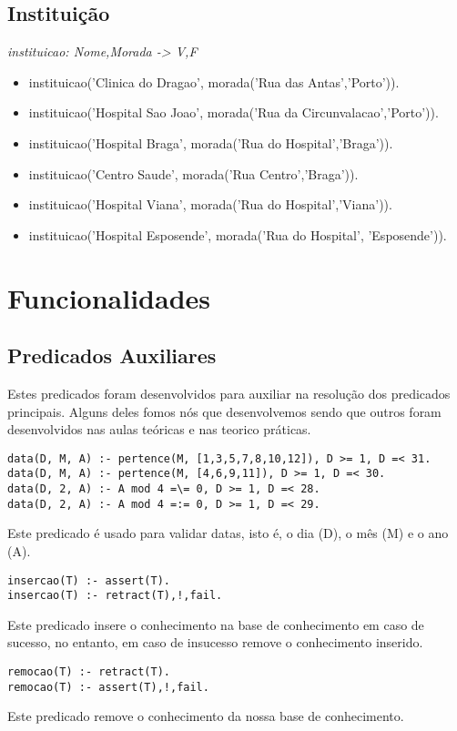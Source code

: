 \documentclass[a4paper]{report} %
\begin{document}
\subsection{Instituição}
\textit{instituicao: Nome,Morada -> {V,F}}
\begin{itemize}
\item instituicao('Clinica do Dragao', morada('Rua das Antas','Porto')).
\item instituicao('Hospital Sao Joao', morada('Rua da Circunvalacao','Porto')).
\item instituicao('Hospital Braga', morada('Rua do Hospital','Braga')).
\item instituicao('Centro Saude', morada('Rua Centro','Braga')).
\item instituicao('Hospital Viana', morada('Rua do Hospital','Viana')).
\item instituicao('Hospital Esposende', morada('Rua do Hospital', 'Esposende')).
\end{itemize}

\section{Funcionalidades}

\subsection{Predicados Auxiliares}

Estes predicados foram desenvolvidos para auxiliar na resolução dos predicados principais. Alguns deles fomos nós que desenvolvemos sendo que outros foram desenvolvidos nas aulas teóricas e nas teorico práticas.

\begin{verbatim}
data(D, M, A) :- pertence(M, [1,3,5,7,8,10,12]), D >= 1, D =< 31.
data(D, M, A) :- pertence(M, [4,6,9,11]), D >= 1, D =< 30.
data(D, 2, A) :- A mod 4 =\= 0, D >= 1, D =< 28.
data(D, 2, A) :- A mod 4 =:= 0, D >= 1, D =< 29.
\end{verbatim}
Este predicado é usado para validar datas, isto é, o dia (D), o mês (M) e o ano (A).

\begin{verbatim}
insercao(T) :- assert(T).
insercao(T) :- retract(T),!,fail.
\end{verbatim}
Este predicado insere o conhecimento na base de conhecimento em caso de sucesso, no entanto, em caso de insucesso remove o conhecimento inserido.

\begin{verbatim}
remocao(T) :- retract(T).
remocao(T) :- assert(T),!,fail.
\end{verbatim}
Este predicado remove o conhecimento da nossa base de conhecimento.
\end{document}

